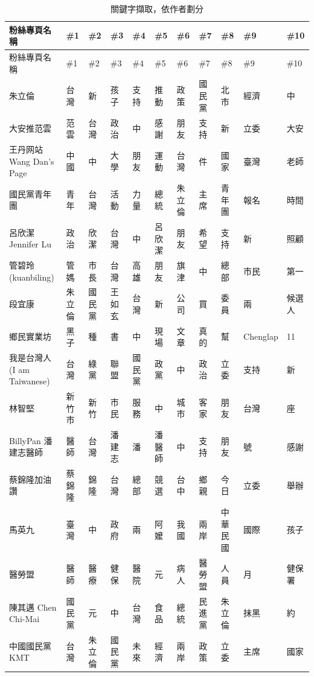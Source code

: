 \documentclass[letterpaper, 10pt, conference]{ieeeconf}   %
\begin{document}
\begin{CJK}{UTF8}{bsmi}
\begin{longtable}[c]{@{}L{2.45cm}L{1.1cm}L{1.1cm}L{1.1cm}L{1.1cm}L{1.1cm}L{1.1cm}L{1.1cm}L{1.1cm}L{1.1cm}L{1.1cm}@{}}
\caption{關鍵字擷取，依作者劃分}
\label{t2}\\
\toprule
粉絲專頁名稱 & \#1 & \#2 & \#3 & \#4 & \#5 & \#6 & \#7 & \#8 & \#9 & \#10 \\* \midrule
\endfirsthead
\toprule
粉絲專頁名稱 & \#1 & \#2 & \#3 & \#4 & \#5 & \#6 & \#7 & \#8 & \#9 & \#10 \\* \midrule
\endhead
%
\bottomrule
\endfoot
%
\endlastfoot
%
朱立倫 & 台灣 & 新 & 孩子 & 支持 & 推動 & 政策 & 國民黨 & 北市 & 經濟 & 中 \\
大安推范雲 & 范雲 & 台灣 & 政治 & 中 & 感謝 & 朋友 & 支持 & 新 & 立委 & 大安 \\
王丹网站 Wang Dan's Page & 中國 & 中 & 大學 & 朋友 & 運動 & 台灣 & 件 & 國家 & 臺灣 & 老師 \\
國民黨青年團 & 青年 & 台灣 & 活動 & 力量 & 總統 & 朱立倫 & 主席 & 青年團 & 報名 & 時間 \\
呂欣潔 Jennifer Lu & 政治 & 欣潔 & 台灣 & 中 & 呂欣潔 & 朋友 & 希望 & 支持 & 新 & 照顧 \\
管碧玲 (kuanbiling) & 管媽 & 市長 & 台灣 & 高雄 & 朋友 & 旗津 & 中 & 總部 & 市民 & 第一 \\
段宜康 & 朱立倫 & 國民黨 & 王如玄 & 台灣 & 新 & 公司 & 買 & 委員 & 兩 & 候選人 \\
鄉民實業坊 & 黑子 & 種 & 書 & 中 & 現場 & 文章 & 真的 & 幫 & Chenglap & 11 \\
我是台灣人 (I am Taiwanese) & 台灣 & 綠黨 & 聯盟 & 國民黨 & 政黨 & 中 & 政治 & 立委 & 支持 & 新 \\
林智堅 & 新竹市 & 新竹 & 市民 & 服務 & 中 & 城市 & 客家 & 朋友 & 台灣 & 座 \\
BillyPan 潘建志醫師 & 醫師 & 台灣 & 潘建志 & 潘 & 潘醫師 & 中 & 支持 & 朋友 & 號 & 感謝 \\
蔡錦隆加油讚 & 蔡錦隆 & 錦隆 & 台灣 & 總部 & 競選 & 台中 & 鄉親 & 今日 & 立委 & 舉辦 \\
馬英九 & 臺灣 & 中 & 政府 & 兩 & 阿嬤 & 我國 & 兩岸 & 中華民國 & 國際 & 孩子 \\
醫勞盟 & 醫師 & 醫療 & 健保 & 醫院 & 元 & 病人 & 醫勞盟 & 人員 & 月 & 健保署 \\
陳其邁 Chen Chi-Mai & 國民黨 & 元 & 中 & 台灣 & 食品 & 總統 & 民進黨 & 朱立倫 & 抹黑 & 約 \\
中國國民黨 KMT & 台灣 & 朱立倫 & 國民黨 & 未來 & 經濟 & 兩岸 & 政策 & 立委 & 主席 & 國家 \\

\end{longtable}
\end{CJK}
\end{document}
